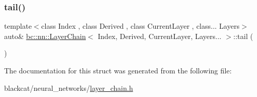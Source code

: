 \mbox{\label{structbc_1_1nn_1_1LayerChain_3_01Index_00_01Derived_00_01CurrentLayer_00_01Layers_8_8_8_01_4_a7b9b92a1c7372cfb57a1631a7352a55a}} 
\subsubsection{\texorpdfstring{tail()}{tail()}\hspace{0.1cm}{\footnotesize\ttfamily [2/2]}}
{\footnotesize\ttfamily template$<$class Index , class Derived , class Current\+Layer , class... Layers$>$ \\
auto\& \hyperlink{structbc_1_1nn_1_1LayerChain}{bc\+::nn\+::\+Layer\+Chain}$<$ Index, Derived, Current\+Layer, Layers... $>$\+::tail (\begin{DoxyParamCaption}{ }\end{DoxyParamCaption})\hspace{0.3cm}{\ttfamily [inline]}}



The documentation for this struct was generated from the following file\+:\begin{DoxyCompactItemize}
\item 
blackcat/neural\+\_\+networks/\hyperlink{layer__chain_8h}{layer\+\_\+chain.\+h}\end{DoxyCompactItemize}
